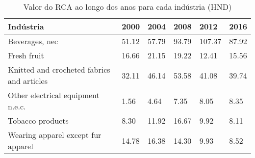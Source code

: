 \begin{table}
\centering
\caption{Valor do RCA ao longo dos anos para cada indústria (HND)}
\label{tab:ex3-tempo-HND}
\begin{tabular}{p{6cm}p{1.5cm}p{1.5cm}p{1.5cm}p{1.5cm}p{1.5cm}}
\toprule
                                 Indústria &  2000 &  2004 &  2008 &   2012 &  2016 \\
\midrule
                            Beverages, nec & 51.12 & 57.79 & 93.79 & 107.37 & 87.92 \\
                               Fresh fruit & 16.66 & 21.15 & 19.22 &  12.41 & 15.56 \\
Knitted and crocheted fabrics and articles & 32.11 & 46.14 & 53.58 &  41.08 & 39.74 \\
         Other electrical equipment n.e.c. &  1.56 &  4.64 &  7.35 &   8.05 &  8.35 \\
                          Tobacco products &  8.30 & 11.92 & 16.67 &   9.92 &  8.11 \\
        Wearing apparel except fur apparel & 14.78 & 16.38 & 14.30 &   9.93 &  8.52 \\
\bottomrule
\end{tabular}
\end{table}
